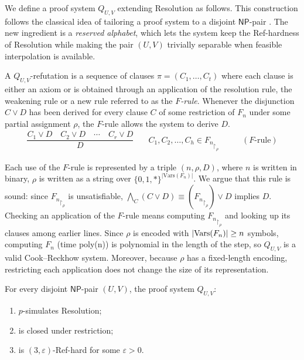 We define a proof system $Q_{U,V}$ extending Resolution as follows. This construction follows the classical idea of tailoring a proof system to a disjoint $\mathsf{NP}$-pair \cite{razborov_np_pairs,beyersdorff_np_pairs,UP}. The new ingredient is a \textit{reserved alphabet}, which lets the system keep the Ref-hardness of Resolution while making the pair $(U, V)$ trivially separable when feasible interpolation is available.

A $Q_{U,V}$-refutation is a sequence of clauses $\pi = (C_1, \ldots, C_t)$ where each clause is either an axiom or is obtained through an application of the resolution rule, the weakening rule or a new rule referred to as the \textit{$F$-rule}. Whenever the disjunction $C \lor D$ has been derived for every clause $C$ of some restriction of $F_n$ under some partial assignment $\rho$, the $F$-rule allows the system to derive $D$.
\[\begin{array}{ccr}
    \dfrac{C_1 \lor D \quad C_2 \lor D \quad \cdots \quad C_r \lor D}{D} &  \quad C_1, C_2, \ldots, C_h \in {F_n}_{\upharpoonright_\rho}\qquad & (F\text{-rule})
\end{array}\]

Each use of the $F$-rule is represented by a triple $(n,\rho,D)$, where $n$ is written in binary, $\rho$ is written as a string over $\{0,1,*\}^{|\mathrm{Vars}(F_n)|}$. We argue that this rule is sound: since ${F_n}_{\upharpoonright_\rho}$ is unsatisfiable, $\bigwedge_{C}(C\lor D)\equiv({F_n}_{\upharpoonright_\rho})\lor D$ implies $D$. Checking an application of the $F$-rule means computing ${F_n}_{\upharpoonright_\rho}$ and looking up its clauses among earlier lines. Since $\rho$ is encoded with $\left|\mathrm{Vars}(F_n)\right| \geq n$ symbols, computing $F_n$ (time poly(n)) is polynomial in the length of the step, so $Q_{U,V}$ is a valid Cook--Reckhow system. Moreover, because $\rho$ has a fixed-length encoding, restricting each application does not change the size of its representation.

\begin{lemma}
    \label{lem:q_uv}
    For every disjoint $\mathsf{NP}$-pair $(U,V)$, the proof system $Q_{U,V}$:
    \begin{enumerate}[label={(\roman*)}, nosep]
        \item $p$-simulates Resolution;
        \item is closed under restriction;
        \item is $(3,\varepsilon)$-Ref-hard for some $\varepsilon > 0$.
    \end{enumerate}
\end{lemma}

